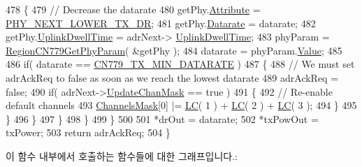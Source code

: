 \begin{DoxyCode}
478                 \{
479                     \textcolor{comment}{// Decrease the datarate}
480                     getPhy.\mbox{\hyperlink{structs_get_phy_params_abdcb168ffd6913b85e2f635d7a475f2d}{Attribute}} = \mbox{\hyperlink{group___r_e_g_i_o_n_gga51cbe8f5433d914fe9cf81b451de2c2dac002e7e492cf30dbf9c544b062f5cc8a}{PHY\_NEXT\_LOWER\_TX\_DR}};
481                     getPhy.\mbox{\hyperlink{structs_get_phy_params_ae2f6080f3aa0e9485c55513ca56bb24d}{Datarate}} = datarate;
482                     getPhy.\mbox{\hyperlink{structs_get_phy_params_a0e6663762d6f9173bc8d8cb018f8f17a}{UplinkDwellTime}} = adrNext->
      \mbox{\hyperlink{structs_adr_next_params_a0e6663762d6f9173bc8d8cb018f8f17a}{UplinkDwellTime}};
483                     phyParam = \mbox{\hyperlink{group___r_e_g_i_o_n_c_n779_gab45c9a48b25622ab197ab8510cc7cbc0}{RegionCN779GetPhyParam}}( &getPhy );
484                     datarate = phyParam.\mbox{\hyperlink{unionu_phy_param_a8e0dcce3428a8051614e852b8836d0d1}{Value}};
485 
486                     \textcolor{keywordflow}{if}( datarate == \mbox{\hyperlink{group___r_e_g_i_o_n_c_n779_ga78e9e4ce4dd6df844573865d9de7e268}{CN779\_TX\_MIN\_DATARATE}} )
487                     \{
488                         \textcolor{comment}{// We must set adrAckReq to false as soon as we reach the lowest datarate}
489                         adrAckReq = \textcolor{keyword}{false};
490                         \textcolor{keywordflow}{if}( adrNext->\mbox{\hyperlink{structs_adr_next_params_a708080da9c63d868556b2c48cb53003b}{UpdateChanMask}} == \textcolor{keyword}{true} )
491                         \{
492                             \textcolor{comment}{// Re-enable default channels}
493                             \mbox{\hyperlink{_region_c_n779_8c_a2188957b5ca6af8092154d7ccbfa5757}{ChannelsMask}}[0] |= \mbox{\hyperlink{group___r_e_g_i_o_n_ga12fa17e5c1016e01a9d82c25027deb1b}{LC}}( 1 ) + \mbox{\hyperlink{group___r_e_g_i_o_n_ga12fa17e5c1016e01a9d82c25027deb1b}{LC}}( 2 ) + 
      \mbox{\hyperlink{group___r_e_g_i_o_n_ga12fa17e5c1016e01a9d82c25027deb1b}{LC}}( 3 );
494                         \}
495                     \}
496                 \}
497             \}
498         \}
499     \}
500 
501     *drOut = datarate;
502     *txPowOut = txPower;
503     \textcolor{keywordflow}{return} adrAckReq;
504 \}
\end{DoxyCode}
이 함수 내부에서 호출하는 함수들에 대한 그래프입니다.\+:
\mbox{\label{group___r_e_g_i_o_n_c_n779_gaf8880a4368c2404e9d629205e9dc769b}} 
